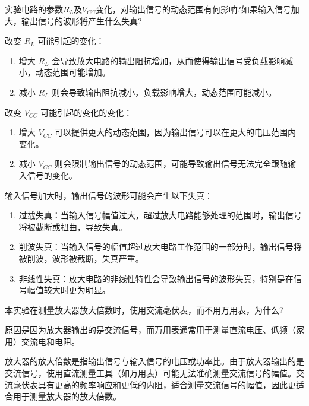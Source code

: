 \documentclass[dvipsnames, svgnames,a4paper,11pt]{article}
\begin{document}
	\begin{question}
		实验电路的参数$R_L$及$V_{CC}$变化，对输出信号的动态范围有何影响?如果输入信号加大，输出信号的波形将产生什么失真?
	\end{question}
		
		改变 $R_L$ 可能引起的变化：
		\begin{enumerate}
			\item 增大 $R_L$ 会导致放大电路的输出阻抗增加，从而使得输出信号受负载影响减小，动态范围可能增加。
			\item 减小 $R_L$ 则会导致输出阻抗减小，负载影响增大，动态范围可能减小。
		\end{enumerate}
		
		改变 $V_{CC}$ 可能引起的变化的变化：
		\begin{enumerate}
			\item 增大 $V_{CC}$ 可以提供更大的动态范围，因为输出信号可以在更大的电压范围内变化。
			\item 减小 $V_{CC}$ 则会限制输出信号的动态范围，可能导致输出信号无法完全跟随输入信号的变化。
		\end{enumerate}
		
		输入信号加大时，输出信号的波形可能会产生以下失真：

		\begin{enumerate}
			\item 过载失真：当输入信号幅值过大，超过放大电路能够处理的范围时，输出信号将被截断或扭曲，导致失真。
	
			\item 削波失真：当输入信号的幅值超过放大电路工作范围的一部分时，输出信号将被削波，波形被截断，失真严重。
			
			\item 非线性失真：放大电路的非线性特性会导致输出信号的波形失真，特别是在信号幅值较大时更为明显。
		\end{enumerate}
	
	
	
	\begin{question}
		本实验在测量放大器放大倍数时，使用交流毫伏表，而不用万用表，为什么?
	\end{question}
	
		原因是因为放大器输出的是交流信号，而万用表通常用于测量直流电压、低频（家用）交流电和电阻。

		放大器的放大倍数是指输出信号与输入信号的电压或功率比。由于放大器输出的是交流信号，使用直流测量工具（如万用表）可能无法准确测量交流信号的幅值。交流毫伏表具有更高的频率响应和更低的内阻，适合测量交流信号的幅值，因此更适合用于测量放大器的放大倍数。
\end{document}
